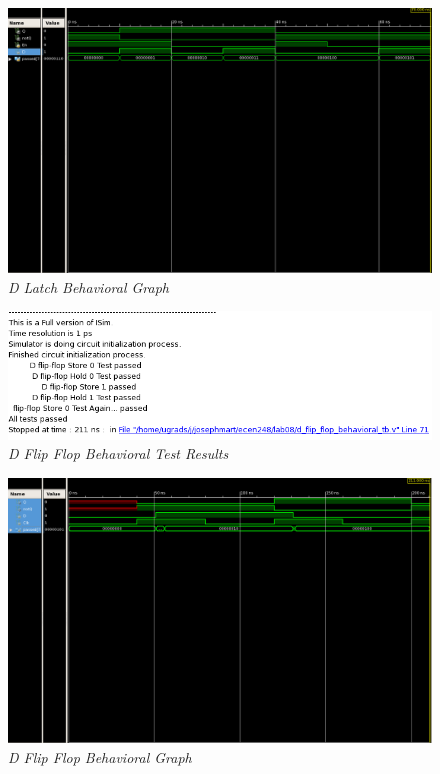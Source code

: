\documentclass[a4paper,12pt]{article}
\begin{document}
  \begin{figure}[h]
    \begin{center}
      \includegraphics[scale=0.3]{d_latch_Behavioral_graph.png}
      \caption{\textit{D Latch Behavioral Graph}}
    \end{center}
  \end{figure}

  \begin{figure}[h]
    \begin{center}
      \includegraphics[scale=0.55]{d_flipflip_behavioral_tests.png}
      \caption{\textit{D Flip Flop Behavioral Test Results}}
    \end{center}
  \end{figure}
  
  \newpage
  
  \begin{figure}[h]
    \begin{center}
      \includegraphics[scale=0.35]{d_flipflip_behavioral_graph.png}
      \caption{\textit{D Flip Flop Behavioral Graph}}
    \end{center}
  \end{figure}
  
\end{document}
